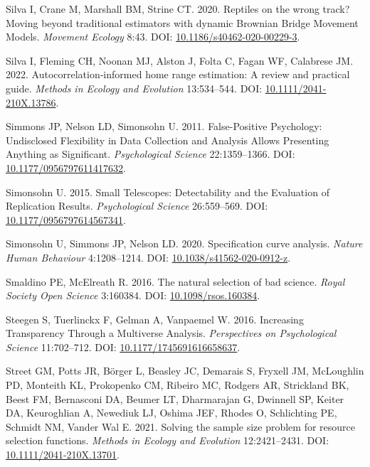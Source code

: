 \documentclass[10pt,a4paper]{article}
\newlength{\cslhangindent}
\newlength{\cslentryspacingunit} %
\newenvironment{CSLReferences}[2] %
 {%
  \setlength{\parindent}{0pt}
  \ifodd #1
  \let\oldpar\par
  \def\par{\hangindent=\cslhangindent\oldpar}
  \fi
  \setlength{\parskip}{#2\cslentryspacingunit}
 }%
 {}
\begin{document}
\begin{CSLReferences}{1}{0}
\leavevmode{}%
Silva I, Crane M, Marshall BM, Strine CT. 2020. Reptiles on the wrong track? {Moving} beyond traditional estimators with dynamic {Brownian} {Bridge} {Movement} {Models}. \emph{Movement Ecology} 8:43. DOI: \href{https://doi.org/10.1186/s40462-020-00229-3}{10.1186/s40462-020-00229-3}.

\leavevmode{}%
Silva I, Fleming CH, Noonan MJ, Alston J, Folta C, Fagan WF, Calabrese JM. 2022. Autocorrelation‐informed home range estimation: {A} review and practical guide. \emph{Methods in Ecology and Evolution} 13:534--544. DOI: \href{https://doi.org/10.1111/2041-210X.13786}{10.1111/2041-210X.13786}.

\leavevmode{}%
Simmons JP, Nelson LD, Simonsohn U. 2011. False-{Positive} {Psychology}: {Undisclosed} {Flexibility} in {Data} {Collection} and {Analysis} {Allows} {Presenting} {Anything} as {Significant}. \emph{Psychological Science} 22:1359--1366. DOI: \href{https://doi.org/10.1177/0956797611417632}{10.1177/0956797611417632}.

\leavevmode{}%
Simonsohn U. 2015. Small {Telescopes}: {Detectability} and the {Evaluation} of {Replication} {Results}. \emph{Psychological Science} 26:559--569. DOI: \href{https://doi.org/10.1177/0956797614567341}{10.1177/0956797614567341}.

\leavevmode{}%
Simonsohn U, Simmons JP, Nelson LD. 2020. Specification curve analysis. \emph{Nature Human Behaviour} 4:1208--1214. DOI: \href{https://doi.org/10.1038/s41562-020-0912-z}{10.1038/s41562-020-0912-z}.

\leavevmode{}%
Smaldino PE, McElreath R. 2016. The natural selection of bad science. \emph{Royal Society Open Science} 3:160384. DOI: \href{https://doi.org/10.1098/rsos.160384}{10.1098/rsos.160384}.

\leavevmode{}%
Steegen S, Tuerlinckx F, Gelman A, Vanpaemel W. 2016. Increasing {Transparency} {Through} a {Multiverse} {Analysis}. \emph{Perspectives on Psychological Science} 11:702--712. DOI: \href{https://doi.org/10.1177/1745691616658637}{10.1177/1745691616658637}.

\leavevmode{}%
Street GM, Potts JR, Börger L, Beasley JC, Demarais S, Fryxell JM, McLoughlin PD, Monteith KL, Prokopenko CM, Ribeiro MC, Rodgers AR, Strickland BK, Beest FM, Bernasconi DA, Beumer LT, Dharmarajan G, Dwinnell SP, Keiter DA, Keuroghlian A, Newediuk LJ, Oshima JEF, Rhodes O, Schlichting PE, Schmidt NM, Vander Wal E. 2021. Solving the sample size problem for resource selection functions. \emph{Methods in Ecology and Evolution} 12:2421--2431. DOI: \href{https://doi.org/10.1111/2041-210X.13701}{10.1111/2041-210X.13701}.


\end{CSLReferences}
\end{document}
